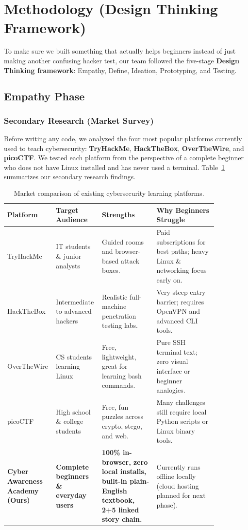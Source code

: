 \documentclass[11pt,a4paper]{article}
\begin{document}
\section{Methodology (Design Thinking Framework)}

To make sure we built something that actually helps beginners instead of just making another confusing hacker test, our team followed the five-stage \textbf{Design Thinking framework}: Empathy, Define, Ideation, Prototyping, and Testing.

\subsection{Empathy Phase}

\subsubsection{Secondary Research (Market Survey)}
Before writing any code, we analyzed the four most popular platforms currently used to teach cybersecurity: \textbf{TryHackMe}, \textbf{HackTheBox}, \textbf{OverTheWire}, and \textbf{picoCTF}. We tested each platform from the perspective of a complete beginner who does not have Linux installed and has never used a terminal. Table~\ref{tab:market_survey} summarizes our secondary research findings.

\begin{table}[!htbp]
\centering
\footnotesize
\renewcommand{\arraystretch}{1.3}
\begin{tabular}{|p{0.16\linewidth}|p{0.17\linewidth}|p{0.25\linewidth}|p{0.28\linewidth}|}
\hline
\textbf{Platform} & \textbf{Target Audience} & \textbf{Strengths} & \textbf{Why Beginners Struggle} \\
\hline
TryHackMe & IT students \& junior analysts & Guided rooms and browser-based attack boxes. & Paid subscriptions for best paths; heavy Linux \& networking focus early on. \\
\hline
HackTheBox & Intermediate to advanced hackers & Realistic full-machine penetration testing labs. & Very steep entry barrier; requires OpenVPN and advanced CLI tools. \\
\hline
OverTheWire & CS students learning Linux & Free, lightweight, great for learning bash commands. & Pure SSH terminal text; zero visual interface or beginner analogies. \\
\hline
picoCTF & High school \& college students & Free, fun puzzles across crypto, stego, and web. & Many challenges still require local Python scripts or Linux binary tools. \\
\hline
\textbf{Cyber Awareness Academy (Ours)} & \textbf{Complete beginners \& everyday users} & \textbf{100\% in-browser, zero local installs, built-in plain-English textbook, 2+5 linked story chain.} & Currently runs offline locally (cloud hosting planned for next phase). \\
\hline
\end{tabular}
\caption{Market comparison of existing cybersecurity learning platforms.}
\label{tab:market_survey}
\end{table}
\end{document}
